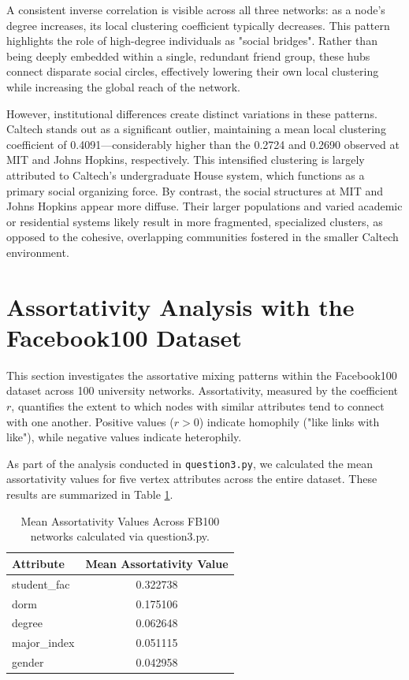 \documentclass[12pt]{article}
\begin{document}
A consistent inverse correlation is visible across all three networks: as a node's degree increases, its local clustering coefficient typically decreases. This pattern highlights the role of high-degree individuals as "social bridges". Rather than being deeply embedded within a single, redundant friend group, these hubs connect disparate social circles, effectively lowering their own local clustering while increasing the global reach of the network.

However, institutional differences create distinct variations in these patterns. Caltech stands out as a significant outlier, maintaining a mean local clustering coefficient of 0.4091—considerably higher than the 0.2724 and 0.2690 observed at MIT and Johns Hopkins, respectively. This intensified clustering is largely attributed to Caltech's undergraduate House system, which functions as a primary social organizing force. By contrast, the social structures at MIT and Johns Hopkins appear more diffuse. Their larger populations and varied academic or residential systems likely result in more fragmented, specialized clusters, as opposed to the cohesive, overlapping communities fostered in the smaller Caltech environment.

\section{Assortativity Analysis with the Facebook100 Dataset}
\label{sec:assortativity}

This section investigates the assortative mixing patterns within the Facebook100 dataset across 100 university networks. Assortativity, measured by the coefficient $r$, quantifies the extent to which nodes with similar attributes tend to connect with one another. Positive values ($r > 0$) indicate homophily ("like links with like"), while negative values indicate heterophily.

As part of the analysis conducted in \texttt{question3.py}, we calculated the mean assortativity values for five vertex attributes across the entire dataset. These results are summarized in Table \ref{tab:assortativity_results}.

\begin{table}[ht!]
    \centering
    \begin{tabular}{|l|c|}
        \hline
        \textbf{Attribute} & \textbf{Mean Assortativity Value} \\ \hline
        student\_fac       & 0.322738                          \\
        dorm               & 0.175106                          \\
        degree             & 0.062648                          \\
        major\_index       & 0.051115                          \\
        gender             & 0.042958                          \\ \hline
    \end{tabular}
    \caption{Mean Assortativity Values Across FB100 networks calculated via question3.py.}
    \label{tab:assortativity_results}
\end{table}
\end{document}
